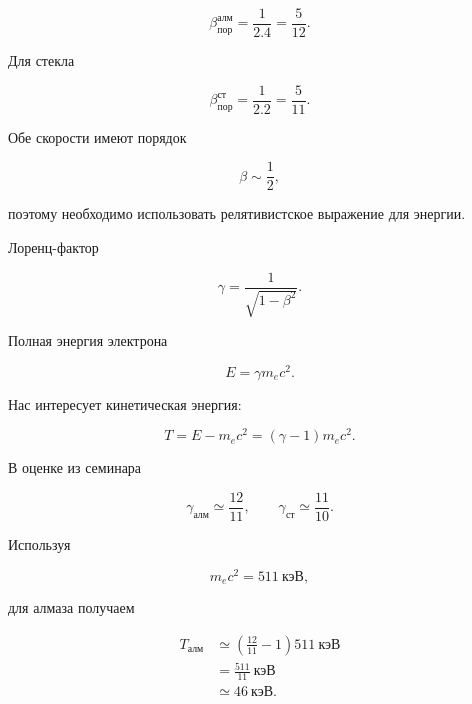 \documentclass[../final.tex]{subfiles}
\begin{document}
\begin{equation*}
    \beta_{\text{пор}}^{\text{алм}}
    =
    \frac{1}{2.4}
    =
    \frac{5}{12}.
\end{equation*}

Для стекла

\begin{equation*}
    \beta_{\text{пор}}^{\text{ст}}
    =
    \frac{1}{2.2}
    =
    \frac{5}{11}.
\end{equation*}

Обе скорости имеют порядок

\begin{equation*}
    \beta\sim\frac12,
\end{equation*}

поэтому необходимо использовать
релятивистское выражение для энергии.

Лоренц-фактор

\begin{equation*}
    \gamma
    =
    \frac{1}{
        \sqrt{1-\beta^2}
    }.
\end{equation*}

Полная энергия электрона

\begin{equation*}
    E
    =
    \gamma m_ec^2.
\end{equation*}

Нас интересует кинетическая энергия:

\begin{equation*}
    T
    =
    E-m_ec^2
    =
    (\gamma-1)m_ec^2.
\end{equation*}

В оценке из семинара

\begin{equation*}
    \gamma_{\text{алм}}
    \simeq
    \frac{12}{11},
    \qquad
    \gamma_{\text{ст}}
    \simeq
    \frac{11}{10}.
\end{equation*}

Используя

\begin{equation*}
    m_ec^2=511\ \text{кэВ},
\end{equation*}

для алмаза получаем

\begin{align*}
    T_{\text{алм}}
    &\simeq
    \left(
        \frac{12}{11}-1
    \right)
    511\ \text{кэВ}
    \\[3pt]
    &=
    \frac{511}{11}\ \text{кэВ}
    \\[3pt]
    &\simeq
    46\ \text{кэВ}.
\end{align*}
\end{document}
